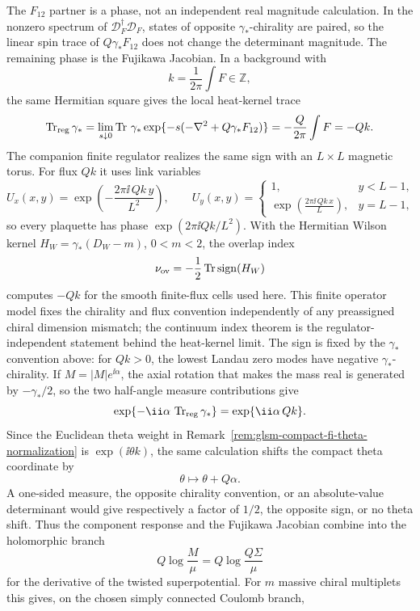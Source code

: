 The \(F_{12}\) partner is a phase, not an independent real magnitude
calculation.  In the nonzero spectrum of \(\mathcal D_F^\dagger\mathcal D_F\),
states of opposite \(\gamma_*\)-chirality are paired, so the linear spin trace
of \(Q\gamma_*F_{12}\) does not change the determinant magnitude.  The
remaining phase is the Fujikawa Jacobian.  In a background with
\[
  k=\frac1{2\pi}\int F\in\mathbb Z,
\]
the same Hermitian square gives the local heat-kernel trace
\[
  \operatorname{Tr}_{\rm reg}\gamma_*
  =
  \lim_{s\downarrow0}
  \operatorname{Tr}\,
  \gamma_*\exp\{-s(-\nabla^2+Q\gamma_*F_{12})\}
  =
  -\frac{Q}{2\pi}\int F
  =
  -Qk .
\]
The companion finite regulator realizes the same sign with an \(L\times L\)
magnetic torus.  For flux \(Qk\) it uses link variables
\[
  U_x(x,y)=
  \exp\!\left(-\frac{2\pi\ii\,Qk\,y}{L^2}\right),
  \qquad
  U_y(x,y)=
  \begin{cases}
    1,& y<L-1,\\
    \exp\!\left(\frac{2\pi\ii\,Qk\,x}{L}\right),& y=L-1,
  \end{cases}
\]
so every plaquette has phase \(\exp(2\pi\ii Qk/L^2)\).  With the Hermitian
Wilson kernel \(H_W=\gamma_*(D_W-m)\), \(0<m<2\), the overlap index
\[
  \nu_{\rm ov}
  =
  -\frac12\operatorname{Tr}\operatorname{sign}(H_W)
\]
computes \(-Qk\) for the smooth finite-flux cells used here.  This finite
operator model fixes the chirality and flux convention independently of any
preassigned chiral dimension mismatch; the continuum index theorem is the
regulator-independent statement behind the heat-kernel limit.
The sign is fixed by the \(\gamma_*\) convention above: for \(Qk>0\), the
lowest Landau zero modes have negative \(\gamma_*\)-chirality.  If
\(M=|M|e^{\ii\alpha}\), the axial rotation that makes the mass real is
generated by \(-\gamma_*/2\), so the two half-angle measure contributions give
\[
  \exp\{-\ii\alpha\,\operatorname{Tr}_{\rm reg}\gamma_*\}
  =
  \exp\{\ii\alpha\,Qk\}.
\]
Since the Euclidean theta weight in
Remark~\ref{rem:glsm-compact-fi-theta-normalization} is
\(\exp(\ii\theta k)\), the same calculation shifts the compact theta
coordinate by
\[
  \theta\longmapsto\theta+Q\alpha .
\]
A one-sided measure, the opposite chirality convention, or an absolute-value
determinant would give respectively a factor of \(1/2\), the opposite sign, or
no theta shift.  Thus the component response and the Fujikawa Jacobian combine
into the holomorphic branch
\[
  Q\log\frac{M}{\mu}
  =
  Q\log\frac{Q\Sigma}{\mu}
\]
for the derivative of the twisted superpotential.  For \(m\) massive chiral
multiplets this gives, on the chosen simply connected Coulomb branch,
